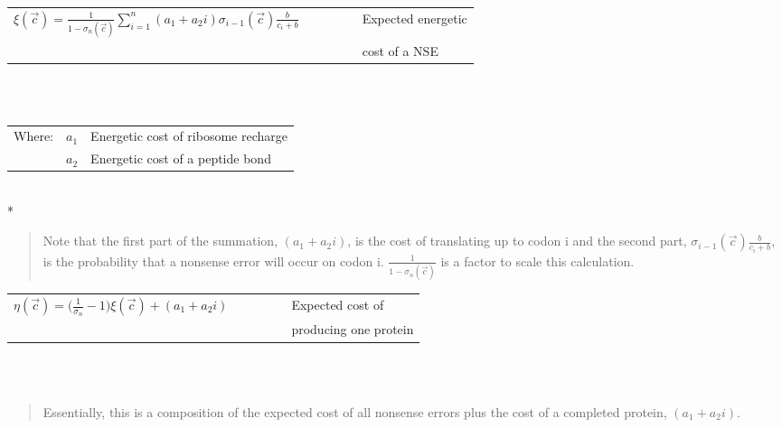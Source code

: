 \documentclass{article}
\begin{document}
	\begin{center}
	
	\begin{tabular}[c]{c|l|}
		\cline{2-2}
		{\Large $\xi(\vec{c}) = \frac{1}{1-\sigma_{n}(\vec{c})}\sum_{i=1}^n(a_{1}+a_{2}i)\sigma_{i-1}(\vec{c})\frac{b}{c_{i}+b}  \qquad \qquad$} & Expected energetic\\
		&  cost of a NSE \\
		\cline{2-2}	
	\end{tabular}\\\
	
	\begin{tabular}{c r @{=} l}
		Where: & $a_{1}$ & Energetic cost of ribosome recharge\\
		& $a_{2}$ & Energetic cost of a peptide bond\\
	\end{tabular}\\*
	
	\end{center}
	
	\begin{quote}
		Note that the first part of the summation, $(a_{1}+a_{2}i)$, is the cost of translating up to codon i and the second part,
		$\sigma_{i-1}(\vec{c})\frac{b}{c_{i}+b}$, is the probability that a nonsense error will occur on codon i. $\frac{1}{1-\sigma_{n}(\vec{c})}$
		is a factor to scale this calculation. \\
	\end{quote} 
	
	\begin{center}
	
	\begin{tabular}[c]{r |l|}
		\cline{2-2}
		{\Large $\eta(\vec{c}) = \bigg(\frac{1}{\sigma_{n}}-1\bigg)\xi(\vec{c}) + (a_{1}+a_{2}i)  \qquad \qquad$} & Expected cost of\\
		& producing one protein\\
		\cline{2-2}
	\end{tabular}\\\
	
	\end{center}
	
	\begin{quote}
		Essentially, this is a composition of the expected cost of all nonsense errors plus the cost of a completed protein,
		$(a_{1}+a_{2}i)$. \\
	\end{quote} 
	
\end{document}
